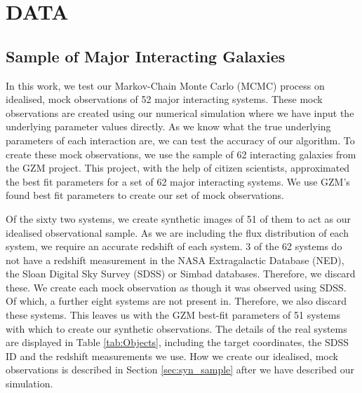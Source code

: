 \vspace{-5mm}
\section{DATA}\label{Data}
\subsection{Sample of Major Interacting Galaxies}
\noindent In this work, we test our Markov-Chain Monte Carlo (MCMC) process on idealised, mock observations of 52 major interacting systems. These mock observations are created using our numerical simulation where we have input the underlying parameter values directly. As we know what the true underlying parameters of each interaction are, we can test the accuracy of our algorithm. To create these mock observations, we use the sample of 62 interacting galaxies from the GZM project. This project, with the help of citizen scientists, approximated the best fit parameters for a set of 62 major interacting systems. We use GZM's found best fit parameters to create our set of mock observations.

Of the sixty two systems, we create synthetic images of 51 of them to act as our idealised observational sample. As we are including the flux distribution of each system, we require an accurate redshift of each system. 3 of the 62 systems do not have a redshift measurement in the NASA Extragalactic Database (NED), the Sloan Digital Sky Survey (SDSS) or Simbad databases. Therefore, we discard these. We create each mock observation as though it was observed using SDSS. Of which, a further eight systems are not present in. Therefore, we also discard these systems. This leaves us with the GZM best-fit parameters of 51 systems with which to create our synthetic observations. The details of the real systems are displayed in Table \ref{tab:Objects}, including the target coordinates, the SDSS ID and the redshift measurements we use. How we create our idealised, mock observations is described in Section \ref{sec:syn_sample} after we have described our simulation.

